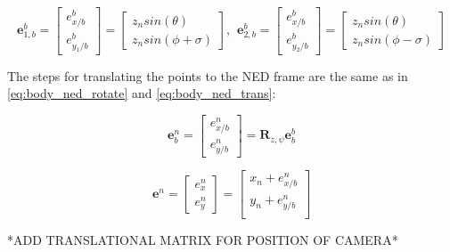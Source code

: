 \begin{equation}
	\bm{e}_{1,b}^b = 
	\begin{bmatrix}
		e^b_{x/b} \\ e^b_{y_1/b}
	\end{bmatrix}
	=
	\begin{bmatrix}
		z_n sin(\theta)\\
		z_n sin(\phi + \sigma)
	\end{bmatrix}
	, \hspace{5pt}
	\bm{e}_{2,b}^b = 
	\begin{bmatrix}
		e^b_{x/b} \\ e^b_{y_2/b}
	\end{bmatrix}
	=
	\begin{bmatrix}
		z_n sin(\theta)\\
		z_n sin(\phi - \sigma)
	\end{bmatrix}
\end{equation}

The steps for translating the points to the NED frame are the same as in \eqref{eq:body_ned_rotate} and \eqref{eq:body_ned_trans}:

\begin{equation}
	\bm{e}_b^n =
	\begin{bmatrix}
		e^n_{x/b} \\ e^n_{y/b}
	\end{bmatrix}
	= \bm{R}_{z,\psi} \bm{e}_b^b
\end{equation}

\begin{equation}
	\bm{e}^n =
	\begin{bmatrix}
		e^n_{x} \\ e^n_{y}
	\end{bmatrix}
	=
	\begin{bmatrix}
		x_n + e^n_{x/b} \\
		y_n + e^n_{y/b} \\
	\end{bmatrix}
\end{equation}
	
*ADD TRANSLATIONAL MATRIX FOR POSITION OF CAMERA*